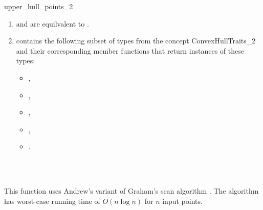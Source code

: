 \begin{ccRefFunction}{upper_hull_points_2}
\begin{enumerate}
   \item    {} and 
            are equilvalent to .
   \item    {} contains the following subset of types from
            the concept ConvexHullTraits\_2 and their corresponding member
            functions that return instances of these types:
            \begin{itemize}
                \item {},
                \item {}, 
                \item {},
                \item {}, 
                \item {}.
            \end{itemize}
\end{enumerate}

\ccSeeAlso

 \\
 \\

\ccImplementation

This function uses Andrew's
variant of Graham's scan algorithm \cite{a-aeach-79,m-mdscg-84}.  The algorithm
has worst-case running time of  $O(n \log n)$ for $n$ input points.

\end{ccRefFunction}


